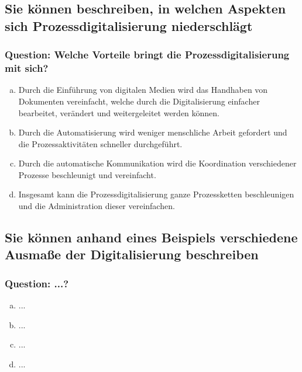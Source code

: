 \documentclass{article}
\begin{document}
\begin{adjustwidth}{2em}{2em}
\begin{adjustwidth}{2em}{2em}
			\subsection{Sie können beschreiben, in welchen Aspekten sich Prozessdigitalisierung niederschlägt}
			\begin{adjustwidth}{1em}{}
				\subsubsection*{Question: Welche Vorteile bringt die Prozessdigitalisierung mit sich?}
				\begin{adjustwidth}{1em}{}
					\begin{enumerate}[(a)]
						\item Durch die Einführung von digitalen Medien wird das Handhaben von Dokumenten vereinfacht, welche durch die Digitalisierung einfacher bearbeitet, verändert und weitergeleitet werden können.
						\item Durch die Automatisierung wird weniger menschliche Arbeit gefordert und die Prozessaktivitäten schneller durchgeführt.
						\item Durch die automatische Kommunikation wird die Koordination verschiedener Prozesse beschleunigt und vereinfacht.
						\item Insgesamt kann die Prozessdigitalisierung ganze Prozessketten beschleunigen und die Administration dieser vereinfachen.
					\end{enumerate}
				\end{adjustwidth}
			\end{adjustwidth}
			\subsection{Sie können anhand eines Beispiels verschiedene Ausmaße der Digitalisierung beschreiben}
			\begin{adjustwidth}{1em}{}
				\subsubsection*{Question: ...?}
				\begin{adjustwidth}{1em}{}
					\begin{enumerate}[(a)]
						\item ...
						\item ...
						\item ...
						\item ...
					\end{enumerate}
				\end{adjustwidth}
			\end{adjustwidth}
		\end{adjustwidth}		
	\end{adjustwidth}
	
\end{document}
